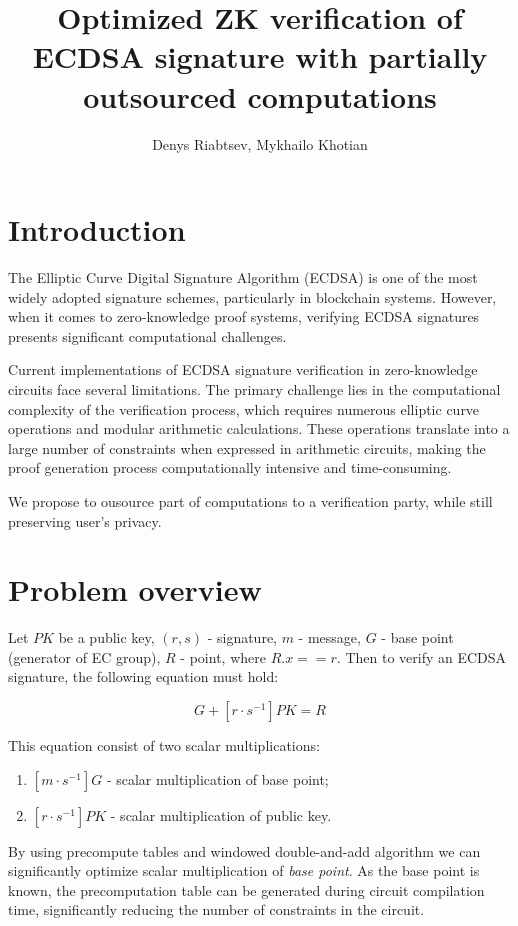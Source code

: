 \documentclass{iacrtrans}
\author{Denys Riabtsev, Mykhailo Khotian}
\institute{Distributed Lab}
\title{Optimized ZK verification of ECDSA signature with partially outsourced computations}
\begin{document}
\maketitle


\section{Introduction}
The Elliptic Curve Digital Signature Algorithm (ECDSA) is one of the most widely adopted signature schemes, particularly in blockchain systems. 
However, when it comes to zero-knowledge proof systems, verifying ECDSA signatures presents significant computational challenges.

Current implementations of ECDSA signature verification in zero-knowledge circuits face several limitations. 
The primary challenge lies in the computational complexity of the verification process, which requires numerous elliptic curve operations and modular arithmetic calculations. 
These operations translate into a large number of constraints when expressed in arithmetic circuits, making the proof generation process computationally intensive and time-consuming.

We propose to ousource part of computations to a verification party, while still preserving user's privacy.


\section{Problem overview}
Let $PK$ be a public key, $(r, s)$ - signature, $m$ - message, $G$ - base point (generator of EC group), $R$ - point, where $R.x == r$.
Then to verify an ECDSA signature, the following equation must hold:

\begin{equation}
    [m \cdot s^{-1}] G + [r \cdot s^{-1}] PK = R
\end{equation}

This equation consist of two scalar multiplications:
\begin{enumerate}
    \item $[m \cdot s^{-1}] G$ - scalar multiplication of base point;
    \item $[r \cdot s^{-1}] PK$ - scalar multiplication of public key.
\end{enumerate}

By using precompute tables and windowed double-and-add algorithm we can significantly optimize scalar multiplication of \textit{base point}.
As the base point is known, the precomputation table can be generated during circuit compilation time, significantly reducing the number 
of constraints in the circuit.
\end{document}
